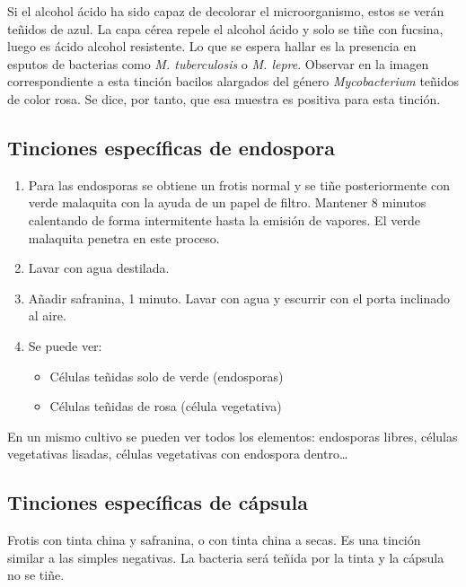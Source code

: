 Si el alcohol ácido ha sido capaz de decolorar el microorganismo, estos se verán teñidos de azul. La capa cérea repele el alcohol ácido y solo se tiñe con fucsina, luego es ácido alcohol resistente. Lo que se espera hallar es la presencia en esputos de bacterias como \textit{M. tuberculosis} o \textit{M. lepre}. Observar en la imagen correspondiente a esta tinción bacilos alargados del género \textit{Mycobacterium} teñidos de color rosa. Se dice, por tanto, que esa muestra es positiva para esta tinción. 
\subsection{Tinciones específicas de endospora}
\begin{enumerate}[itemsep=0pt,parsep=0pt,topsep=0pt,partopsep=0pt]
	\item Para las endosporas  se obtiene un frotis normal y se tiñe posteriormente con verde malaquita con la ayuda de un papel de filtro. Mantener 8 minutos calentando de forma intermitente hasta la emisión de vapores. El verde malaquita penetra en este proceso. 
	\item Lavar con agua destilada.
	\item Añadir safranina, 1 minuto. Lavar con agua y escurrir con el porta inclinado al aire.
	\item Se puede ver:
	\begin{itemize}[itemsep=0pt,parsep=0pt,topsep=0pt,partopsep=0pt]
		\item Células teñidas solo de verde (endosporas)
		\item Células teñidas de rosa (célula vegetativa)
	\end{itemize}
\end{enumerate}
En un mismo cultivo se pueden ver todos los elementos: endosporas libres, células vegetativas lisadas, células vegetativas con endospora dentro…
\subsection{Tinciones específicas de cápsula}
Frotis con tinta china y safranina, o con tinta china a secas. Es una tinción similar a las simples negativas. La bacteria será teñida por la tinta y la cápsula no se tiñe.
